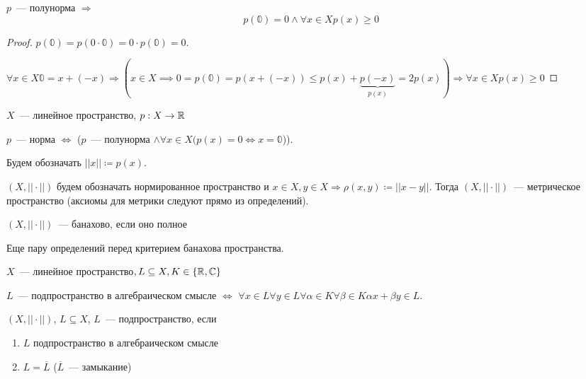\documentclass[document]{subfiles}
\begin{document}
\begin{property}
    $p$~--- полунорма $\Rightarrow$
    \[ p(\mathbb{0}) = 0 \land \forall x \in X p(x) \geq 0 \]
\end{property}

\begin{proof}
    $p(\mathbb{0}) = p(0 \cdot \mathbb{0}) = 0 \cdot p(\mathbb{0}) = 0$.

    $\forall x \in X \mathbb{0} = x + (-x) \Rightarrow (x \in X \implies 0 = p(\mathbb{0}) = p(x + (-x)) \leq p(x) + \underbrace{p(-x)}_{p(x)} = 2 p(x)) \Rightarrow \forall x \in X p(x) \geq 0$
\end{proof}

\begin{definition}[Норма]
    $X$~--- линейное пространство, $p : X \rightarrow \mathbb{R}$

    $p$~--- норма $\Leftrightarrow $ ($p$~--- полунорма $\land \forall x \in X (p(x) = 0 \iff x = \mathbb{0}$)).

    Будем обозначать $||x|| \coloneqq p(x)$.
\end{definition}
$(X, || \cdot ||)$ будем обозначать нормированное пространство и $x \in X, y \in X \Rightarrow \rho(x,y) \coloneqq ||x-y||$. Тогда $(X,||\cdot ||)$~--- метрическое пространство (аксиомы для метрики следуют прямо из определений).

\begin{definition}
    $(X, || \cdot ||)$~--- банахово, если оно полное
\end{definition}
Еще пару определений перед критерием банахова пространства.

\begin{definition}
    $X$~--- линейное пространство$,L \subseteq X, K \in \{ \mathbb{R}, \mathbb{C} \}$

    $L$~--- подпространство в алгебраическом смысле $\Leftrightarrow$ $\forall x \in L \forall y \in L \forall \alpha \in K \forall \beta \in K \alpha x + \beta y \in L$.
\end{definition}

\begin{definition}[подпространство]
    $(X, || \cdot ||)$, $L \subseteq X$, $L$~--- подпространство, если
    \begin{enumerate}
        \item $L$ подпространство в алгебраическом смысле
        \item $L = \overline{L}$ ($\overline{L}$~--- замыкание)
    \end{enumerate}
\end{definition}
\end{document}
